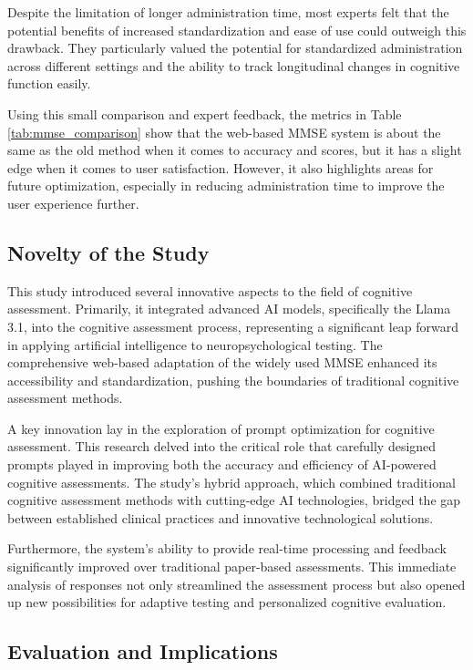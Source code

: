Despite the limitation of longer administration time, most experts felt that the potential benefits of increased standardization and ease of use could outweigh this drawback. They particularly valued the potential for standardized administration across different settings and the ability to track longitudinal changes in cognitive function easily.

Using this small comparison and expert feedback, the metrics in Table \ref{tab:mmse_comparison} show that the web-based MMSE system is about the same as the old method when it comes to accuracy and scores, but it has a slight edge when it comes to user satisfaction. However, it also highlights areas for future optimization, especially in reducing administration time to improve the user experience further.

\subsection{Novelty of the Study}

This study introduced several innovative aspects to the field of cognitive assessment. Primarily, it integrated advanced AI models, specifically the Llama 3.1, into the cognitive assessment process, representing a significant leap forward in applying artificial intelligence to neuropsychological testing. The comprehensive web-based adaptation of the widely used MMSE enhanced its accessibility and standardization, pushing the boundaries of traditional cognitive assessment methods.

A key innovation lay in the exploration of prompt optimization for cognitive assessment. This research delved into the critical role that carefully designed prompts played in improving both the accuracy and efficiency of AI-powered cognitive assessments. The study's hybrid approach, which combined traditional cognitive assessment methods with cutting-edge AI technologies, bridged the gap between established clinical practices and innovative technological solutions.

Furthermore, the system's ability to provide real-time processing and feedback significantly improved over traditional paper-based assessments. This immediate analysis of responses not only streamlined the assessment process but also opened up new possibilities for adaptive testing and personalized cognitive evaluation.

\subsection{Evaluation and Implications}

